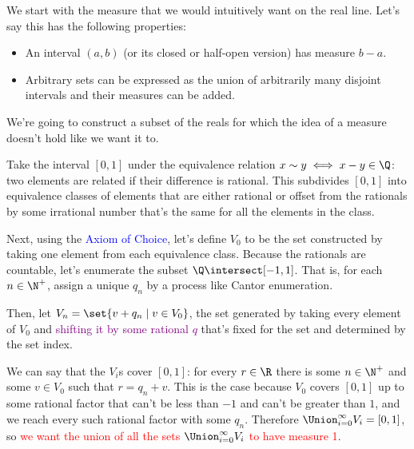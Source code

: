 \documentclass[./analysis.tex]{subfiles}
\begin{document}
    We start with the measure that we would intuitively want on the real line. Let's say this has the following properties:

    \begin{itemize}
        \setlength\itemsep{1pt}
        \item An interval $(a, b)$ (or its closed or half-open version) has measure $b - a$.
        \item Arbitrary sets can be expressed as the union of arbitrarily many disjoint intervals and their measures can be added.
    \end{itemize}
    
    We're going to construct a subset of the reals for which the idea of a measure doesn't hold like we want it to.

    Take the interval $[0, 1]$ under the equivalence relation $x \sim y \iff x - y \in \Q$: two elements are related if their difference is rational. This subdivides $[0, 1]$ into equivalence classes of elements that are either rational or offset from the rationals by some irrational number that's the same for all the elements in the class. %

    Next, using the \textcolor{blue}{Axiom of Choice}, let's define $V_0$ to be the set constructed by taking one element from each equivalence class. Because the rationals are countable, let's enumerate the subset $\Q \intersect [-1, 1]$. That is, for each $n \in \N^+$, assign a unique $q_n$ by a process like Cantor enumeration. 
    
    Then, let $V_n = \set{v + q_n \mid v \in V_0}$, the set generated by taking every element of $V_0$ and \textcolor{purple}{shifting it by some rational $q$} that's fixed for the set and determined by the set index.


    We can say that the $V_i$s cover $[0, 1]$: for every $r \in \R$ there is some $n \in \N^+$ and some $v \in V_0$ such that $r = q_n + v$. This is the case because $V_0$ covers $[0, 1]$ up to some rational factor that can't be less than $-1$ and can't be greater than $1$, and we reach every such rational factor with some $q_n$. Therefore $\Union_{i=0}^\infty V_i = [0, 1]$, so \textcolor{red}{we want the union of all the sets $\Union_{i=0}^\infty V_i$ to have measure 1}.
\end{document}
